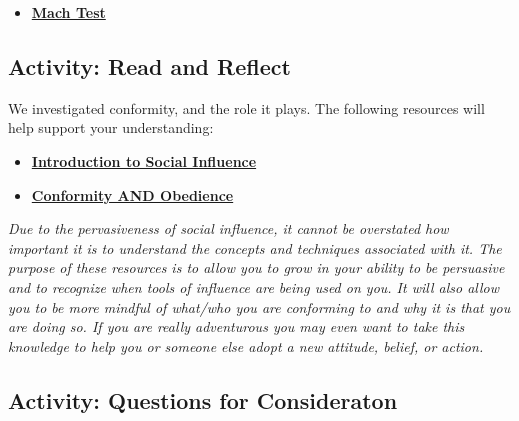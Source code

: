 \documentclass[
]{book}
\providecommand{\tightlist}{%
  \setlength{\itemsep}{0pt}\setlength{\parskip}{0pt}}
\begin{document}
\begin{itemize}
\tightlist
\item
  \href{https://openpsychometrics.org/tests/MACH-IV/}{\textbf{Mach Test}}
\end{itemize}

\hypertarget{activity-read-and-reflect-7}{%
\subsection*{Activity: Read and Reflect}\label{activity-read-and-reflect-7}}

\begin{reflect}
We investigated conformity, and the role it plays. The following resources will help support your understanding:

\begin{itemize}
\tightlist
\item
  \href{http://www.workingpsychology.com/intro.html}{\textbf{Introduction to Social Influence}}\\
\item
  \href{https://webspace.ship.edu/cgboer/conformity.html}{\textbf{Conformity AND Obedience}}
\end{itemize}

\emph{Due to the pervasiveness of social influence, it cannot be overstated how important it is to understand the concepts and techniques associated with it. The purpose of these resources is to allow you to grow in your ability to be persuasive and to recognize when tools of influence are being used on you. It will also allow you to be more mindful of what/who you are conforming to and why it is that you are doing so. If you are really adventurous you may even want to take this knowledge to help you or someone else adopt a new attitude, belief, or action.}
\end{reflect}

\hypertarget{activity-questions-for-consideraton}{%
\subsection*{Activity: Questions for Consideraton}\label{activity-questions-for-consideraton}}
\end{document}
